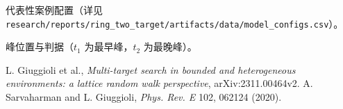 \documentclass[11pt]{ctexart}
\begin{document}
\begin{table}[!htbp]
  \centering
  \caption{代表性案例配置（详见 \texttt{research/reports/ring\_two\_target/artifacts/data/model\_configs.csv}）。}
  \label{tab:configs}
  
\end{table}

\begin{table}[!htbp]
  \centering
  \caption{峰位置与判据（$t_1$ 为最早峰，$t_2$ 为最晚峰）。}
  \label{tab:peaks}
  
\end{table}

\begin{thebibliography}{9}
L. Giuggioli et al., \emph{Multi-target search in bounded and heterogeneous environments: a lattice random walk perspective}, arXiv:2311.00464v2.
A. Sarvaharman and L. Giuggioli, \emph{Phys. Rev. E} 102, 062124 (2020).
\end{thebibliography}
\end{document}
